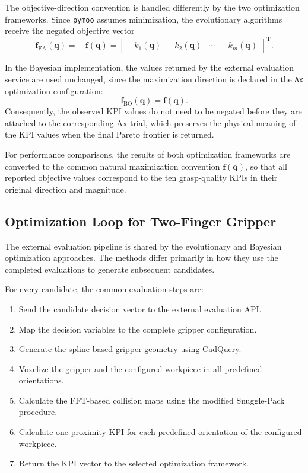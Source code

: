 The objective-direction convention is handled differently by the two optimization frameworks. Since
\texttt{pymoo} assumes minimization, the evolutionary algorithms receive the negated objective
vector
\begin{equation}
    \mathbf{f}_{\mathrm{EA}}(\mathbf{q})
    =
    -\,\mathbf{f}(\mathbf{q})
    =
    \begin{bmatrix}
        -k_1(\mathbf{q}) &
        -k_2(\mathbf{q}) &
        \cdots &
        -k_{m}(\mathbf{q})
    \end{bmatrix}^{\mathrm{T}}.
\end{equation}

In the Bayesian implementation, the values returned by the external evaluation service are used
unchanged, since the maximization direction is declared in the \texttt{Ax} optimization
configuration:
\begin{equation}
    \mathbf{f}_{\mathrm{BO}}(\mathbf{q})
    =
    \mathbf{f}(\mathbf{q}).
\end{equation}
Consequently, the observed KPI values do not need to be negated before they are attached to the
corresponding Ax trial, which preserves the physical meaning of the KPI values when the final Pareto
frontier is returned.

For performance comparisons, the results of both optimization frameworks are converted to the common
natural maximization convention $\mathbf{f}(\mathbf{q})$, so that all reported objective values
correspond to the ten grasp-quality KPIs in their original direction and magnitude.

\subsection{Optimization Loop for Two-Finger Gripper}
\label{sec:two_finger_optimization_loop}

The external evaluation pipeline is shared by the evolutionary and Bayesian optimization approaches.
The methods differ primarily in how they use the completed evaluations to generate subsequent
candidates.

For every candidate, the common evaluation steps are:
\begin{enumerate}
    \item Send the candidate decision vector to the external evaluation API.
    \item Map the decision variables to the complete gripper configuration.
    \item Generate the spline-based gripper geometry using CadQuery.
    \item Voxelize the gripper and the configured workpiece in all predefined orientations.
    \item Calculate the FFT-based collision maps using the modified Snuggle-Pack procedure.
    \item Calculate one proximity KPI for each predefined orientation of the configured workpiece.
    \item Return the KPI vector to the selected optimization framework.
\end{enumerate}

